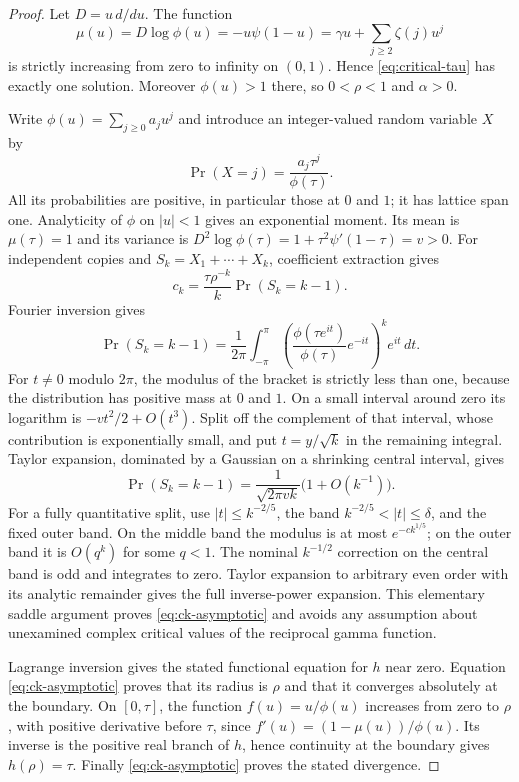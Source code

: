 \begin{proof}
Let $D=u\,d/du$.  The function
\[
 \mu(u)=D\log\phi(u)=-u\psi(1-u)
 =\gamma u+\sum_{j\ge2}\zeta(j)u^j
\]
is strictly increasing from zero to infinity on $(0,1)$.  Hence
\eqref{eq:critical-tau} has exactly one solution.
Moreover $\phi(u)>1$ there, so $0<\rho<1$ and $\alpha>0$.

Write $\phi(u)=\sum_{j\ge0}a_ju^j$ and introduce an integer-valued random
variable $X$ by
\[
 \Pr(X=j)=\frac{a_j\tau^j}{\phi(\tau)}.
\]
All its probabilities are positive, in particular those at $0$ and $1$;
it has lattice span one.  Analyticity of $\phi$ on $|u|<1$ gives an
exponential moment.  Its mean is $\mu(\tau)=1$ and its variance is
$D^2\log\phi(\tau)=1+\tau^2\psi'(1-\tau)=v>0$.
For independent copies and $S_k=X_1+\cdots+X_k$, coefficient extraction gives
\begin{equation}
 c_k=\frac{\tau\rho^{-k}}k\Pr(S_k=k-1).
 \label{eq:coefficient-probability}
\end{equation}
Fourier inversion gives
\[
 \Pr(S_k=k-1)=\frac1{2\pi}\int_{-\pi}^{\pi}
 \left(\frac{\phi(\tau e^{it})}{\phi(\tau)}e^{-it}\right)^k e^{it}\,dt.
\]
For $t\ne0$ modulo $2\pi$, the modulus of the bracket is strictly less
than one, because the distribution has positive mass at $0$ and $1$.
On a small interval around zero its logarithm is
$-vt^2/2+O(t^3)$.  Split off the complement of that interval, whose
contribution is exponentially small, and put $t=y/\sqrt{k}$ in the
remaining integral.  Taylor expansion, dominated by a Gaussian on a
shrinking central interval, gives
\[
 \Pr(S_k=k-1)=\frac1{\sqrt{2\pi vk}}\bigl(1+O(k^{-1})\bigr).
\]
For a fully quantitative split, use $|t|\le k^{-2/5}$, the band
$k^{-2/5}<|t|\le\delta$, and the fixed outer band.  On the middle
band the modulus is at most $e^{-c k^{1/5}}$; on the outer band it is
$O(q^k)$ for some $q<1$.  The nominal $k^{-1/2}$ correction on the
central band is odd and integrates to zero.  Taylor expansion to arbitrary
even order with its analytic remainder gives the full inverse-power expansion.  This elementary saddle argument proves
\eqref{eq:ck-asymptotic} and avoids any assumption about unexamined complex
critical values of the reciprocal gamma function.

Lagrange inversion gives the stated functional equation for $h$ near zero.
Equation \eqref{eq:ck-asymptotic} proves that its radius is $\rho$ and that
it converges absolutely at the boundary.  On $[0,\tau]$, the function
$f(u)=u/\phi(u)$ increases from zero to $\rho$, with positive derivative
before $\tau$, since $f'(u)=(1-\mu(u))/\phi(u)$.  Its inverse is the
positive real branch of $h$, hence continuity at the boundary gives
$h(\rho)=\tau$.  Finally \eqref{eq:ck-asymptotic} proves the stated divergence.
\end{proof}

